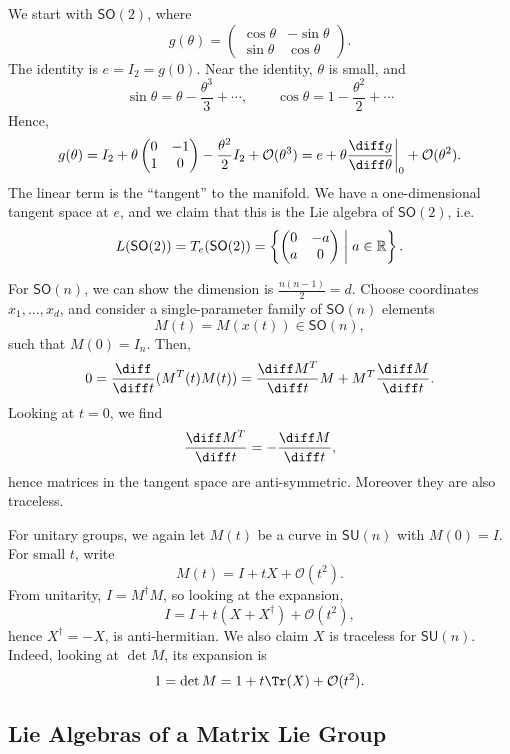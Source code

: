 \documentclass[12pt]{article}
\begin{document}
We start with $\mathsf{SO}(2)$, where
\[
g(\theta) =
\begin{pmatrix}
	\cos \theta & -\sin \theta \\
	\sin \theta & \cos \theta
\end{pmatrix}.
\]
The identity is $e = I_2 = g(0)$. Near the identity, $\theta$ is small, and
\[
\sin \theta = \theta - \frac{\theta^3}{3} + \cdots, \qquad \cos \theta = 1 - \frac{\theta^2}{2} + \cdots
\]
Hence,
\[
g(\theta) = I_2 + \theta
\begin{pmatrix}
	0 & -1 \\ 1 & 0
\end{pmatrix} - \frac{\theta^2}{2} I_2 + \mathcal{O}(\theta^3) = e + \theta \frac{\diff g}{\diff \theta} \biggr|_{0} + \mathcal{O}(\theta^2).
\]
The linear term is the ``tangent'' to the manifold. We have a one-dimensional tangent space at $e$, and we claim that this is the Lie algebra of $\mathsf{SO}(2)$, i.e.
\[
L(\mathsf{SO}(2)) = T_e(\mathsf{SO}(2)) = \left\{
	\begin{pmatrix}
		0 & -a \\ a & 0
	\end{pmatrix}
\biggm| a \in \mathbb{R} \right\}.
\]

For $\mathsf{SO}(n)$, we can show the dimension is $\frac{n(n-1)}{2} = d$. Choose coordinates $x_1, \ldots, x_d$, and consider a single-parameter family of $\mathsf{SO}(n)$ elements
\[
M(t) = M(x(t)) \in \mathsf{SO}(n),
\]
such that $M(0) = I_n$. Then,
\[
0 = \frac{\diff}{\diff t} (M^T(t) M(t)) = \frac{\diff M^T}{\diff t} M + M^T \frac{\diff M}{\diff t}.
\]
Looking at $t = 0$, we find
\[
\frac{\diff M^T}{\diff t} = - \frac{\diff M}{\diff t},
\]
hence matrices in the tangent space are anti-symmetric. Moreover they are also traceless.


For unitary groups, we again let $M(t)$ be a curve in $\mathsf{SU}(n)$ with $M(0) = I$. For small $t$, write
\[
M(t) = I + t X + \mathcal{O}(t^2).
\]
From unitarity, $I = M^{\dagger} M$, so looking at the expansion,
\[
I = I + t(X + X^\dagger) + \mathcal{O}(t^2),
\]
hence $X^\dagger = -X$, is anti-hermitian. We also claim $X$ is traceless for $\mathsf{SU}(n)$. Indeed, looking at $\det M$, its expansion is
\[
1 = \det M = 1 + t \Tr(X) + \mathcal{O}(t^2).
\]
\subsection{Lie Algebras of a Matrix Lie Group}%
\label{sub:la_mlg}
\end{document}
